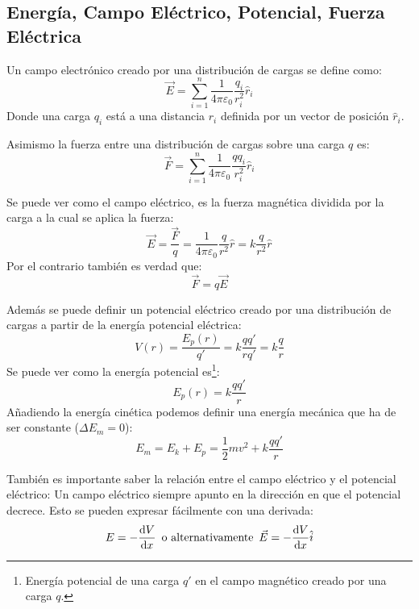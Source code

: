 \documentclass[arial,a4paper,print]{article}
\begin{document}
\subsection{Energía, Campo Eléctrico, Potencial, Fuerza Eléctrica}
Un campo electrónico creado por una distribución de cargas se define como:
\begin{equation*}
	\vec{E} = \sum^{n}_{i=1}\frac{1}{4\pi\varepsilon_{0}}\frac{q_{i}}{r^{2}_{i}}\hat{r}_{i}
\end{equation*} 
Donde una carga $q_{i}$ está a una distancia $r_{i}$ definida por un vector de posición $\hat{r}_{i}$.

Asimismo la fuerza entre una distribución de cargas sobre una carga $q$ es:
\begin{equation*}
	\vec{F} = \sum_{i=1}^{n}\frac{1}{4\pi\varepsilon_{0}}\frac{qq_{i}}{r^{2}_{i}}\hat{r}_{i}
\end{equation*}

Se puede ver como el campo eléctrico, es la fuerza magnética dividida por la carga a la cual se aplica la fuerza:
\begin{equation*}
	\vec{E} = \frac{\vec{F}}{q} = \frac{1}{4\pi\varepsilon_{0}} \frac{q}{r^{2}}\hat{r} = k\frac{q}{r^2}\hat{r}
\end{equation*}
Por el contrario también es verdad que:
\begin{equation*}
	\vec{F} = q\vec{E}
\end{equation*}

Además se puede definir un potencial eléctrico creado por una distribución de cargas a partir de la energía potencial eléctrica:
\begin{equation*}
	V(r) = \frac{E_{p}(r)}{q'} = k\frac{qq'}{rq'} = k\frac{q}{r}
\end{equation*} 
Se puede ver como la energía potencial es\footnote{Energía potencial de una carga $q'$ en el campo magnético creado por una carga $q$.}:
\begin{equation*}
	E_{p}(r)=k\frac{qq'}{r}
\end{equation*}
Añadiendo la energía cinética podemos definir una energía mecánica que ha de ser constante ($\Delta E_{m} = 0$):
\begin{equation*}
	E_{m} = E_{k} + E_{p} = \frac12 mv^{2} + k\frac{qq'}{r}
\end{equation*}

También es importante saber la relación entre el campo eléctrico y el potencial eléctrico: Un campo eléctrico siempre apunto en la dirección en que el potencial decrece. Esto se pueden expresar fácilmente con una derivada:
\begin{equation*}
	E = -\dv{V}{x}\,\text{ o alternativamente }\, \vec{E} = -\dv{V}{x}\hat{i}
\end{equation*}
\end{document}
